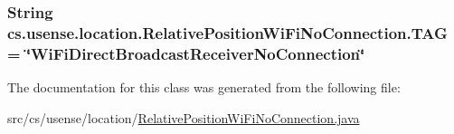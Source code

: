 \subsubsection[{T\+A\+G}]{\setlength{\rightskip}{0pt plus 5cm}String cs.\+usense.\+location.\+Relative\+Position\+Wi\+Fi\+No\+Connection.\+T\+A\+G = \char`\"{}Wi\+Fi\+Direct\+Broadcast\+Receiver\+No\+Connection\char`\"{}\hspace{0.3cm}{\ttfamily [private]}}\label{classcs_1_1usense_1_1location_1_1_relative_position_wi_fi_no_connection_af9ae70af673210e1cc1a6c8e215b36a2}


The documentation for this class was generated from the following file\+:\begin{DoxyCompactItemize}
\item 
src/cs/usense/location/\hyperlink{_relative_position_wi_fi_no_connection_8java}{Relative\+Position\+Wi\+Fi\+No\+Connection.\+java}\end{DoxyCompactItemize}
